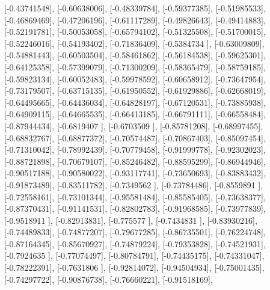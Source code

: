 \documentclass{article}
\begin{document}
       [-0.43741548],
       [-0.60638006],
       [-0.48339784],
       [-0.59377385],
       [-0.51985533],
       [-0.46869469],
       [-0.47206196],
       [-0.61117289],
       [-0.49826643],
       [-0.49414883],
       [-0.52191781],
       [-0.50053058],
       [-0.65794102],
       [-0.51325508],
       [-0.51700015],
       [-0.52246016],
       [-0.54193402],
       [-0.71836409],
       [-0.5384734 ],
       [-0.63009809],
       [-0.54881443],
       [-0.60503504],
       [-0.58461862],
       [-0.56184538],
       [-0.59625301],
       [-0.64125358],
       [-0.57399079],
       [-0.71300209],
       [-0.58365479],
       [-0.58759185],
       [-0.59823134],
       [-0.60052483],
       [-0.59978592],
       [-0.60658912],
       [-0.73647954],
       [-0.73179507],
       [-0.63715135],
       [-0.61950552],
       [-0.61929886],
       [-0.62668019],
       [-0.64495665],
       [-0.64436034],
       [-0.64828197],
       [-0.67120531],
       [-0.73885938],
       [-0.64909115],
       [-0.64665535],
       [-0.66413185],
       [-0.66791111],
       [-0.66558484],
       [-0.87944434],
       [-0.6819407 ],
       [-0.6703509 ],
       [-0.85781208],
       [-0.68997455],
       [-0.68832767],
       [-0.68877372],
       [-0.70574487],
       [-0.70867403],
       [-0.85097454],
       [-0.71310042],
       [-0.78992439],
       [-0.70779458],
       [-0.91999778],
       [-0.92302023],
       [-0.88721898],
       [-0.70679107],
       [-0.85246482],
       [-0.88595299],
       [-0.86944946],
       [-0.90517188],
       [-0.90580022],
       [-0.93117741],
       [-0.73650693],
       [-0.83883432],
       [-0.91873489],
       [-0.83511782],
       [-0.7349562 ],
       [-0.73784486],
       [-0.8559891 ],
       [-0.72558161],
       [-0.73101344],
       [-0.95581484],
       [-0.85585405],
       [-0.73638377],
       [-0.87370431],
       [-0.91141531],
       [-0.82802783],
       [-0.91968585],
       [-0.73977839],
       [-0.9518911 ],
       [-0.82913831],
       [-0.775577  ],
       [-0.7434831 ],
       [-0.83930216],
       [-0.74489833],
       [-0.74877207],
       [-0.79677285],
       [-0.86735501],
       [-0.76224748],
       [-0.87164345],
       [-0.85670927],
       [-0.74879224],
       [-0.79353828],
       [-0.74521931],
       [-0.7924635 ],
       [-0.77074497],
       [-0.80784791],
       [-0.74435175],
       [-0.74331047],
       [-0.78222391],
       [-0.7631806 ],
       [-0.92814072],
       [-0.94504934],
       [-0.75001435],
       [-0.74297722],
       [-0.90876738],
       [-0.76660221],
       [-0.91518169],
\end{document}
